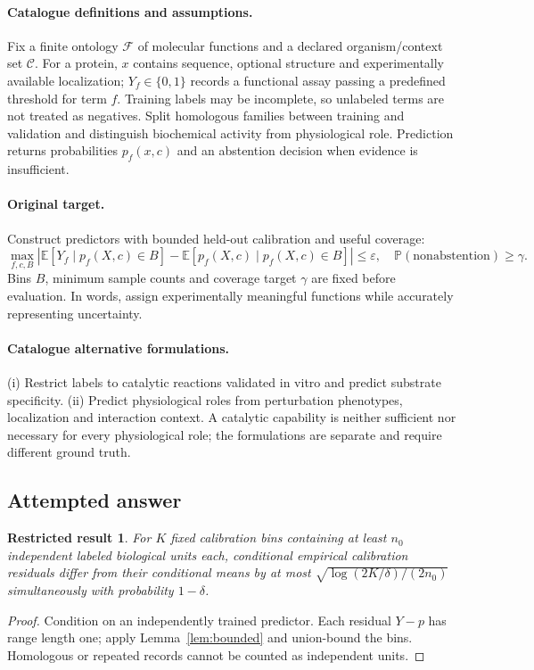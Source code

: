 \documentclass[11pt]{article}
\newcommand{\E}{\mathbb E}
\newcommand{\Prob}{\mathbb P}
\providecommand{\E}{\mathbb E}
\providecommand{\Prob}{\mathbb P}
\newtheorem{attemptresult}{Restricted result}[section]
\begin{document}
\paragraph{Catalogue definitions and assumptions.}
Fix a finite ontology $\mathcal F$ of molecular functions and a declared organism/context set $\mathcal C$. For a protein, $x$ contains sequence, optional structure and experimentally available localization; $Y_f\in\{0,1\}$ records a functional assay passing a predefined threshold for term $f$. Training labels may be incomplete, so unlabeled terms are not treated as negatives. Split homologous families between training and validation and distinguish biochemical activity from physiological role. Prediction returns probabilities $p_f(x,c)$ and an abstention decision when evidence is insufficient.
\paragraph{Original target.}
Construct predictors with bounded held-out calibration and useful coverage:
\[
\max_{f,c,B}\left|\E[Y_f\mid p_f(X,c)\in B]-\E[p_f(X,c)\mid p_f(X,c)\in B]\right|\leq\varepsilon,
\quad \Prob(\mathrm{nonabstention})\geq\gamma.
\]
Bins $B$, minimum sample counts and coverage target $\gamma$ are fixed before evaluation. In words, assign experimentally meaningful functions while accurately representing uncertainty.
\paragraph{Catalogue alternative formulations.}
(i) Restrict labels to catalytic reactions validated in vitro and predict substrate specificity. (ii) Predict physiological roles from perturbation phenotypes, localization and interaction context. A catalytic capability is neither sufficient nor necessary for every physiological role; the formulations are separate and require different ground truth.
\subsection{Attempted answer}
\begin{attemptresult}
For $K$ fixed calibration bins containing at least $n_0$ independent labeled biological units each, conditional empirical calibration residuals differ from their conditional means by at most $\sqrt{\log(2K/\delta)/(2n_0)}$ simultaneously with probability $1-\delta$.
\end{attemptresult}
\begin{proof}
Condition on an independently trained predictor. Each residual $Y-p$ has range length one; apply Lemma~\ref{lem:bounded} and union-bound the bins. Homologous or repeated records cannot be counted as independent units.
\end{proof}
\end{document}
